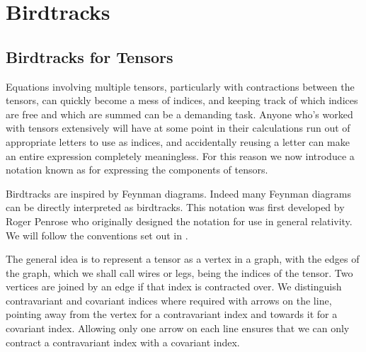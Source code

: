 \documentclass[fleqn]{NotesClass}
\begin{document}
    
    \section{Birdtracks}
    \subsection{Birdtracks for Tensors}
    Equations involving multiple tensors, particularly with contractions between the tensors, can quickly become a mess of indices, and keeping track of which indices are free and which are summed can be a demanding task.
    Anyone who's worked with tensors extensively will have at some point in their calculations run out of appropriate letters to use as indices, and accidentally reusing a letter can make an entire expression completely meaningless.
    For this reason we now introduce a notation known as  for expressing the components of tensors.
    
    Birdtracks are inspired by Feynman diagrams.
    Indeed many Feynman diagrams can be directly interpreted as birdtracks.
    This notation was first developed by Roger Penrose \cites{penrose}[240]{penrose-road-to-reality} who originally designed the notation for use in general relativity.
    We will follow the conventions set out in \cite{cvitanovic}.
    
    The general idea is to represent a tensor as a vertex in a graph, with the edges of the graph, which we shall call wires or legs, being the indices of the tensor.
    Two vertices are joined by an edge if that index is contracted over.
    We distinguish contravariant and covariant indices where required with arrows on the line, pointing away from the vertex for a contravariant index and towards it for a covariant index.
    Allowing only one arrow on each line ensures that we can only contract a contravariant index with a covariant index.
    
\end{document}
